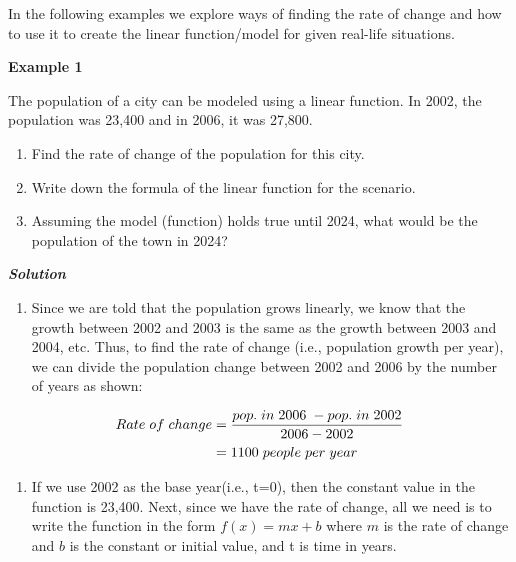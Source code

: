 \documentclass[
  letterpaper,
  DIV=11,
  numbers=noendperiod]{scrreprt}
\providecommand{\tightlist}{%
  \setlength{\itemsep}{0pt}\setlength{\parskip}{0pt}}\usepackage{longtable,booktabs,array}
\begin{document}
In the following examples we explore ways of finding the rate of change
and how to use it to create the linear function/model for given
real-life situations.

\textbf{Example 1}

The population of a city can be modeled using a linear function. In
2002, the population was 23,400 and in 2006, it was 27,800.

\begin{enumerate}
\def\labelenumi{\alph{enumi})}
\item
  Find the rate of change of the population for this city.
\item
  Write down the formula of the linear function for the scenario.
\item
  Assuming the model (function) holds true until 2024, what would be the
  population of the town in 2024?
\end{enumerate}

\textbf{\emph{Solution}}

\begin{enumerate}
\def\labelenumi{\alph{enumi})}
\tightlist
\item
  Since we are told that the population grows linearly, we know that the
  growth between 2002 and 2003 is the same as the growth between 2003
  and 2004, etc. Thus, to find the rate of change (i.e., population
  growth per year), we can divide the population change between 2002 and
  2006 by the number of years as shown:
\end{enumerate}

\begin{align} 
Rate\hspace{.04in} of\hspace{.04in} change &=  \frac{pop. \hspace{.04in} in \hspace{.04in} 2006 \hspace{.04in}- pop. \hspace{.04in} in \hspace{.04in} 2002}{2006-2002}\\&= 1100\hspace{.04in} people\hspace{.04in} per \hspace{.04in} year
\end{align}

\begin{enumerate}
\def\labelenumi{\alph{enumi})}
\setcounter{enumi}{1}
\tightlist
\item
  If we use 2002 as the base year(i.e., t=0), then the constant value in
  the function is 23,400. Next, since we have the rate of change, all we
  need is to write the function in the form \(f(x)=mx+b\) where \(m\) is
  the rate of change and \(b\) is the constant or initial value, and t
  is time in years.
\end{enumerate}
\end{document}
